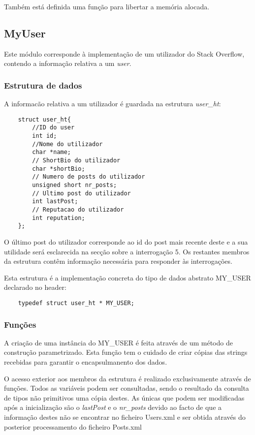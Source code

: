 \documentclass[10pt]{article}
\begin{document}
	Também está definida uma função para libertar a memória alocada.

\subsection{MyUser}
	Este módulo corresponde à implementação de um utilizador do Stack Overflow, contendo a informação relativa a um \emph{user}. 
\subsubsection{Estrutura de dados}
	
	A informacão relativa a um utilizador é guardada na estrutura \emph{user\_ht}:
	\begin{lstlisting}
	struct user_ht{
		//ID do user 
		int id;
		//Nome do utilizador 
		char *name;
		// ShortBio do utilizador 
		char *shortBio;
		// Numero de posts do utilizador 
		unsigned short nr_posts;
		// Ultimo post do utilizador 
		int lastPost;
		// Reputacao do utilizador 
		int reputation;
	};
	\end{lstlisting}


	O último post do utilizador corresponde ao id do post mais recente deste e a sua utilidade será esclarecida na secção sobre a interrogação 5. Os restantes membros da estrutura contêm informação necessária para responder às interrogações.

	Esta estrutura é a implementação concreta do tipo de dados abstrato MY\_USER declarado no header:
	\begin{lstlisting} 
	typedef struct user_ht * MY_USER;
	\end{lstlisting}

\subsubsection{Funções}

	A criação de uma instância do MY\_USER é feita através de um método de construção parametrizado. Esta função tem o cuidado de criar cópias das strings recebidas para garantir o encapsulmanento dos dados.

	O acesso exterior aos membros da estrutura é realizado exclusivamente através de funções. Todos as variáveis podem ser consultadas, sendo o resultado da consulta de tipos não primitivos uma cópia destes. As únicas que podem ser modificadas após a inicialização são o \emph{lastPost} e o \emph{nr\_posts} devido ao facto de que a informação destes não se encontrar no ficheiro Users.xml e ser obtida através do posterior processamento do ficheiro Posts.xml
\end{document}
